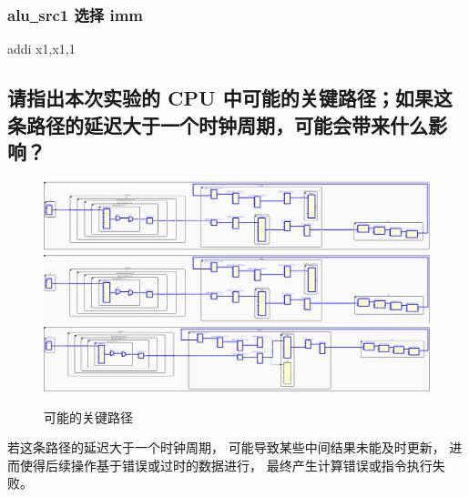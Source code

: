 \documentclass[12pt,a4paper]{ctexart}
\begin{document}
\subsubsection{alu\underline{~}src1 选择 imm}
addi x1,x1,1
\subsection{请指出本次实验的 CPU 中可能的关键路径；如果这条路径的延迟大于一个时钟周期，可能会带来什么影响？}
\begin{figure}[H]
    \centering
    \includegraphics[scale=0.4]{pic/7.png}
    \includegraphics[scale=0.4]{pic/8.png}
    \includegraphics[scale=0.4]{pic/9.png}
    \caption{可能的关键路径}
\end{figure}
若这条路径的延迟大于一个时钟周期，
可能导致某些中间结果未能及时更新，
进而使得后续操作基于错误或过时的数据进行，
最终产生计算错误或指令执行失败。
\end{document}
